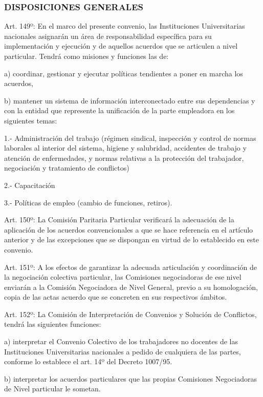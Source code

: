 \documentclass[]{article}
\begin{document}
\subsubsection{DISPOSICIONES GENERALES}\label{disposiciones-generales}

Art. 149º: En el marco del presente convenio, las Instituciones
Universitarias nacionales asignarán un área de responsabilidad
específica para su implementación y ejecución y de aquellos acuerdos que
se articulen a nivel particular. Tendrá como misiones y funciones las
de:

a) coordinar, gestionar y ejecutar políticas tendientes a poner en
marcha los acuerdos,

b) mantener un sistema de información interconectado entre sus
dependencias y con la entidad que represente la unificación de la parte
empleadora en los siguientes temas:

1.- Administración del trabajo (régimen sindical, inspección y control
de normas laborales al interior del sistema, higiene y salubridad,
accidentes de trabajo y atención de enfermedades, y normas relativas a
la protección del trabajador, negociación y tratamiento de conflictos)

2.- Capacitación

3.- Políticas de empleo (cambio de funciones, retiros).

Art. 150º: La Comisión Paritaria Particular verificará la adecuación de
la aplicación de los acuerdos convencionales a que se hace referencia en
el artículo anterior y de las excepciones que se dispongan en virtud de
lo establecido en este convenio.

Art. 151º: A los efectos de garantizar la adecuada articulación y
coordinación de la negociación colectiva particular, las Comisiones
negociadoras de ese nivel enviarán a la Comisión Negociadora de Nivel
General, previo a su homologación, copia de las actas acuerdo que se
concreten en sus respectivos ámbitos.

Art. 152º: La Comisión de Interpretación de Convenios y Solución de
Conflictos, tendrá las siguientes funciones:

a) interpretar el Convenio Colectivo de los trabajadores no docentes de
las Instituciones Universitarias nacionales a pedido de cualquiera de
las partes, conforme lo establece el art. 14º del Decreto 1007/95.

b) interpretar los acuerdos particulares que las propias Comisiones
Negociadoras de Nivel particular le sometan.
\end{document}
